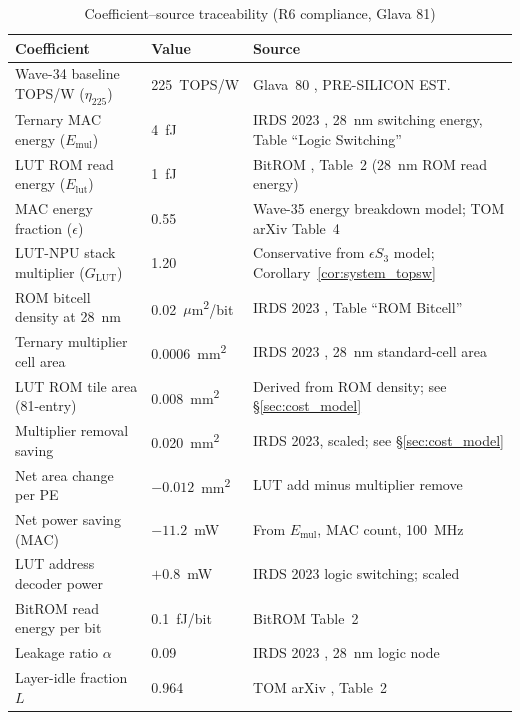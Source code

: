 \begin{table}[ht]
\centering
\caption{Coefficient--source traceability (R6 compliance, Glava 81)}
\label{tab:coefficients_sources}
\begin{tabular}{p{4.2cm}p{2.5cm}p{5.8cm}}
\hline
Coefficient & Value & Source \\
\hline
Wave-34 baseline TOPS/W ($\eta_{225}$) & 225~TOPS/W & Glava~80 \cite{glava80_tom_layer_gate}, PRE-SILICON EST. \\
Ternary MAC energy ($E_{\mathrm{mul}}$) & 4~fJ & IRDS 2023 \cite{irds2023}, 28~nm switching energy, Table ``Logic Switching'' \\
LUT ROM read energy ($E_{\mathrm{lut}}$) & 1~fJ & BitROM \cite{bitrom_2025}, Table~2 (28~nm ROM read energy) \\
MAC energy fraction ($\epsilon$) & 0.55 & Wave-35 energy breakdown model; TOM arXiv \cite{tom_arxiv_2602} Table~4 \\
LUT-NPU stack multiplier ($G_{\mathrm{LUT}}$) & 1.20 & Conservative from $\epsilon S_3$ model; Corollary~\ref{cor:system_topsw} \\
ROM bitcell density at 28~nm & 0.02~$\mu$m\textsuperscript{2}/bit & IRDS 2023 \cite{irds2023}, Table ``ROM Bitcell'' \\
Ternary multiplier cell area & 0.0006~mm\textsuperscript{2} & IRDS 2023 \cite{irds2023}, 28~nm standard-cell area \\
LUT ROM tile area (81-entry) & 0.008~mm\textsuperscript{2} & Derived from ROM density; see \S\ref{sec:cost_model} \\
Multiplier removal saving & 0.020~mm\textsuperscript{2} & IRDS 2023, scaled; see \S\ref{sec:cost_model} \\
Net area change per PE & $-0.012$~mm\textsuperscript{2} & LUT add minus multiplier remove \\
Net power saving (MAC) & $-11.2$~mW & From $E_{\mathrm{mul}}$, MAC count, 100~MHz \\
LUT address decoder power & $+0.8$~mW & IRDS 2023 logic switching; scaled \\
BitROM read energy per bit & 0.1~fJ/bit & BitROM \cite{bitrom_2025} Table~2 \\
Leakage ratio $\alpha$ & 0.09 & IRDS 2023 \cite{irds2023}, 28~nm logic node \\
Layer-idle fraction $L$ & 0.964 & TOM arXiv \cite{tom_arxiv_2602}, Table~2 \\
\hline
\end{tabular}
\end{table}

